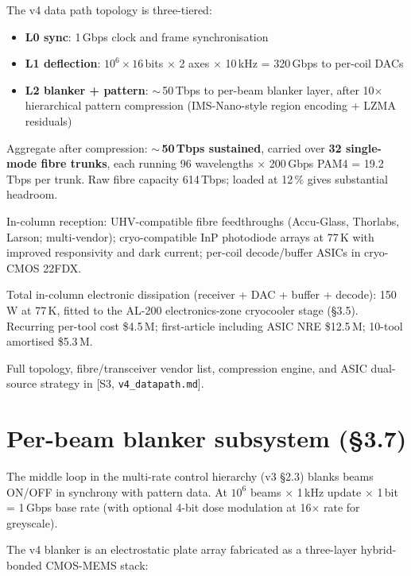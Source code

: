 \documentclass[11pt,letterpaper]{article}
\begin{document}
The v4 data path topology is three-tiered:

\begin{itemize}[leftmargin=1.6em]
  \item \textbf{L0 sync}: 1\,Gbps clock and frame synchronisation
  \item \textbf{L1 deflection}: $10^6 \times 16$\,bits $\times$ 2 axes $\times$ 10\,kHz = 320\,Gbps to per-coil DACs
  \item \textbf{L2 blanker + pattern}: $\sim$\,50\,Tbps to per-beam blanker layer, after 10$\times$ hierarchical pattern compression (IMS-Nano-style region encoding + LZMA residuals)
\end{itemize}

Aggregate after compression: \textbf{$\sim$\,50\,Tbps sustained}, carried over \textbf{32 single-mode fibre trunks}, each running 96 wavelengths $\times$ 200\,Gbps PAM4 = 19.2\,Tbps per trunk. Raw fibre capacity 614\,Tbps; loaded at 12\,\% gives substantial headroom.

In-column reception: UHV-compatible fibre feedthroughs (Accu-Glass, Thorlabs, Larson; multi-vendor); cryo-compatible InP photodiode arrays at 77\,K with improved responsivity and dark current; per-coil decode/buffer ASICs in cryo-CMOS 22FDX.

Total in-column electronic dissipation (receiver + DAC + buffer + decode): 150\,W at 77\,K, fitted to the AL-200 electronics-zone cryocooler stage (\S 3.5). Recurring per-tool cost \$4.5\,M; first-article including ASIC NRE \$12.5\,M; 10-tool amortised \$5.3\,M.

Full topology, fibre/transceiver vendor list, compression engine, and ASIC dual-source strategy in [S3, \texttt{v4\_datapath.md}].

\section{Per-beam blanker subsystem (\S 3.7)}

The middle loop in the multi-rate control hierarchy (v3 \S 2.3) blanks beams ON/OFF in synchrony with pattern data. At $10^6$ beams $\times$ 1\,kHz update $\times$ 1\,bit = 1\,Gbps base rate (with optional 4-bit dose modulation at 16$\times$ rate for greyscale).

The v4 blanker is an electrostatic plate array fabricated as a three-layer hybrid-bonded CMOS-MEMS stack:
\end{document}
